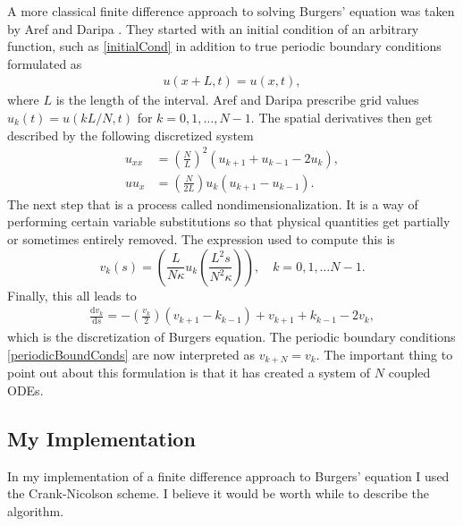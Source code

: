 \documentclass[undefended]{sfuthesis}
\begin{document}
A more classical finite difference approach to solving Burgers' equation was taken by Aref and Daripa \cite{burgerFiniteDiff}. They started with an initial condition of an arbitrary function, such as \eqref{initialCond} in addition to true periodic boundary conditions formulated as
\begin{align}
u(x + L, t) = u(x, t), \label{periodicBoundConds}
\end{align}
where $L$ is the length of the interval. Aref and Daripa prescribe grid values $u_k(t) = u(kL/N, t)$ for $k = 0, 1, \dots, N - 1$. The spatial derivatives then get described by the following discretized system
\begin{align*}
u_{xx} &= \left(\frac{N}{L}\right)^2 (u_{k + 1} + u_{k - 1} - 2u_k), \\
uu_x   &= \left(\frac{N}{2L}\right) u_k (u_{k + 1} - u_{k - 1}).
\end{align*}
The next step that is a process called nondimensionalization. It is a way of performing certain variable substitutions so that physical quantities get partially or sometimes entirely removed. The expression used to compute this is \[v_k(s) = \left(\frac{L}{N \kappa} u_k \left(\frac{L^2 s}{N^2 \kappa}\right)\right), \quad k = 0, 1, \dots N - 1.\] Finally, this all leads to 
\begin{align*}
\frac{\mathrm{d} v_k}{\mathrm{d} s} = - \left(\frac{v_k}{2}\right) (v_{k + 1} - k_{k - 1}) + v_{k+ 1} + k_{k - 1} - 2 v_k,
\end{align*}
which is the discretization of Burgers equation. The periodic boundary conditions \eqref{periodicBoundConds} are now interpreted as $v_{k + N} = v_k$. The important thing to point out about this formulation is that it has created a system of $N$ coupled ODEs.

\subsection{My Implementation}

In my implementation of a finite difference approach to Burgers' equation I used the Crank-Nicolson scheme. I believe it would be worth while to describe the algorithm.
\end{document}
